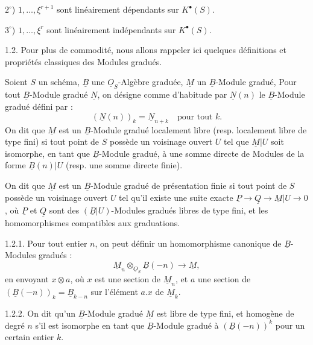 
\(2^\circ\)) \(1,\ldots,\xi^{r+1}\)
sont linéairement dépendants sur \(K^{\bullet}(S)\).

\(3^\circ\)) \(1,\ldots,\xi^r\) sont linéairement indépendants sur \(K^{\bullet}(S)\).

1.2.
Pour plus de commodité, nous allons rappeler ici quelques définitions et propriétés classiques des Modules gradués.

Soient \(S\) un schéma, \(\underline{B}\) une \(\underline{O}_S\)-Algèbre graduée, \(\underline{M}\) un \(\underline{B}\)-Module gradué, Pour tout \(\underline{B}\)-Module gradué \(\underline{N}\), on désigne comme d'habitude par \(\underline{N}(n)\) le \(\underline{B}\)-Module gradué défini par :
\[
  (\underline{N}(n))_k=\underline{N}_{n+k}\quad\text{pour tout }k.
\]
On dit que \(\underline{M}\) est un \(\underline{B}\)-Module gradué localement libre (resp. localement libre de type fini) si tout point de \(S\) possède un voisinage ouvert \(U\) tel que \(\underline{M}|U\) soit isomorphe, en tant que \(\underline{B}\)-Module gradué, à une somme directe de Modules de la forme \(\underline{B}(n)|U\) (resp. une somme directe finie).

On dit que \(\underline{M}\) est un \(\underline{B}\)-Module gradué de présentation finie si tout point de \(S\) possède un voisinage ouvert \(U\) tel qu'il existe une suite exacte \(\underline{P}\longrightarrow \underline{Q}\longrightarrow \underline{M}|U\longrightarrow 0\), où \(\underline{P}\) et \(\underline{Q}\) sont des \((\underline{B}|U)\)-Modules gradués libres de type fini, et les homomorphismes compatibles aux graduations.

1.2.1. Pour tout entier \(n\), on peut définir un homomorphisme canonique de \(\underline{B}\)-Modules gradués :
\begin{equation}\tag{1.2.1}
  \underline{M}_n\otimes_{\underline{O}_S} \underline{B}(-n)\longrightarrow \underline{M},
\end{equation}
en envoyant \(x\otimes a\), où \(x\) est une section de \(\underline{M}_n\), et \(a\) une section de \((\underline{B}(-n))_k=\underline{B}_{k-n}\) sur l'élément \(a.x\) de \(\underline{M}_k\).

1.2.2. On dit qu'un \(\underline{B}\)-Module gradué \(\underline{M}\) est libre de type fini, et homogène de degré \(n\) s'il est isomorphe en tant que \(\underline{B}\)-Module gradué à \((\underline{B}(-n))^k\) pour un certain entier \(k\).

